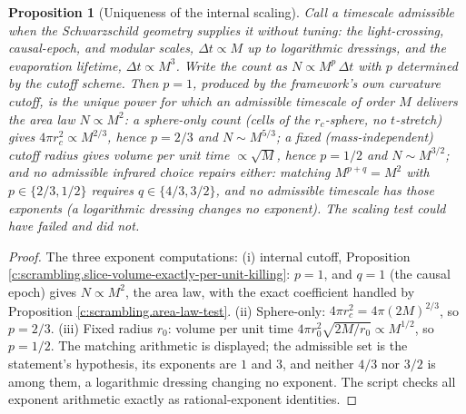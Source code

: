 \documentclass[11pt]{article}
\newtheorem{proposition}[theorem]{Proposition}
\theoremstyle{definition}
\theoremstyle{plain}
\begin{document}
\begin{proposition}[Uniqueness of the internal scaling]\label{c:scrambling.uniqueness-internal-scaling}
Call a timescale \emph{admissible} when the Schwarzschild geometry supplies it without tuning: the light-crossing, causal-epoch, and modular scales, $\Delta t \propto M$ up to logarithmic dressings, and the evaporation lifetime, $\Delta t \propto M^3$. Write the count as $N \propto M^p\,\Delta t$ with $p$ determined by the cutoff scheme. Then $p = 1$, produced by the framework's own curvature cutoff, is the \emph{unique} power for which an admissible timescale of order $M$ delivers the area law $N \propto M^2$: a sphere-only count (cells of the $r_c$-sphere, no $t$-stretch) gives $4\pi r_c^2 \propto M^{2/3}$, hence $p = 2/3$ and $N \sim M^{5/3}$; a fixed (mass-independent) cutoff radius gives volume per unit time $\propto \sqrt{M}$, hence $p = 1/2$ and $N \sim M^{3/2}$; and no admissible infrared choice repairs either: matching $M^{p + q} = M^2$ with $p \in \{2/3, 1/2\}$ requires $q \in \{4/3, 3/2\}$, and no admissible timescale has those exponents (a logarithmic dressing changes no exponent). The scaling test could have failed and did not.
\end{proposition}
\begin{proof}
The three exponent computations: (i) internal cutoff, Proposition \ref{c:scrambling.slice-volume-exactly-per-unit-killing}: $p = 1$, and $q = 1$ (the causal epoch) gives $N \propto M^2$, the area law, with the exact coefficient handled by Proposition \ref{c:scrambling.area-law-test}. (ii) Sphere-only: $4\pi r_c^2 = 4\pi(2M)^{2/3}$, so $p = 2/3$. (iii) Fixed radius $r_0$: volume per unit time $4\pi r_0^2\sqrt{2M/r_0} \propto M^{1/2}$, so $p = 1/2$. The matching arithmetic is displayed; the admissible set is the statement's hypothesis, its exponents are $1$ and $3$, and neither $4/3$ nor $3/2$ is among them, a logarithmic dressing changing no exponent. The script checks all exponent arithmetic exactly as rational-exponent identities.

\end{proof}
\end{document}

